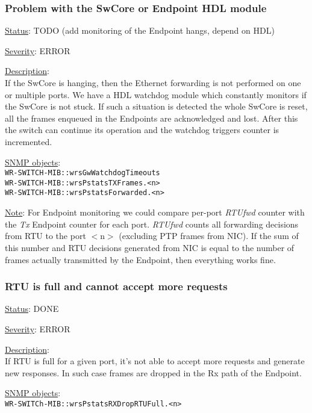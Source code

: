 \subsubsection{\bf Problem with the SwCore or Endpoint HDL module}
		\label{fail:data:swcore_hang}
		\begin{packed_enum}
    \item [] \underline{Status}: TODO (add monitoring of the Endpoint hangs, depend on
      HDL)
			\item [] \underline{Severity}: ERROR
			\item [] \underline{Description}:\\
				If the SwCore is hanging, then the Ethernet forwarding is not
				performed on one or multiple ports. We have a HDL watchdog module which
				constantly monitors if the SwCore is not stuck. If such a situation is
				detected the whole SwCore is reset, all the frames enqueued in the
				Endpoints are acknowledged and lost. After this the switch can continue
				its operation and the watchdog triggers counter is incremented.
			\item [] \underline{SNMP objects}:\\
				\texttt{WR-SWITCH-MIB::wrsGwWatchdogTimeouts}\\
				\texttt{WR-SWITCH-MIB::wrsPstatsTXFrames.<n>}\\
				\texttt{WR-SWITCH-MIB::wrsPstatsForwarded.<n>}
			\item [] \underline{Note}: For Endpoint monitoring we could compare
				per-port \emph{RTUfwd} counter with the \emph{Tx} Endpoint counter for
				each port. \emph{RTUfwd} counts all forwarding decisions from RTU to the
				port $<$n$>$ (excluding PTP frames from NIC). If the sum of this number
				and RTU decisions generated from NIC is equal to the number of frames
				actually transmitted by the Endpoint, then everything works fine.
		\end{packed_enum}

\subsubsection{\bf RTU is full and cannot accept more requests}
		\label{fail:data:rtu_full}
		\begin{packed_enum}
			\item [] \underline{Status}: DONE
			\item [] \underline{Severity}: ERROR
			\item [] \underline{Description}:\\
				If RTU is full for a given port, it's not able to accept more requests
				and generate new responses. In such case frames are dropped in the
				Rx path of the Endpoint.
			\item [] \underline{SNMP objects}:\\
				\texttt{WR-SWITCh-MIB::wrsPstatsRXDropRTUFull.<n>}
		\end{packed_enum}

